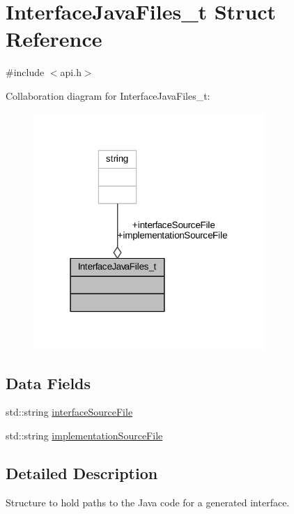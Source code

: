 \hypertarget{struct_interface_java_files__t}{}\section{Interface\+Java\+Files\+\_\+t Struct Reference}
\label{struct_interface_java_files__t}


{\ttfamily \#include $<$api.\+h$>$}



Collaboration diagram for Interface\+Java\+Files\+\_\+t\+:
\nopagebreak
\begin{figure}[H]
\begin{center}
\leavevmode
\includegraphics[width=250pt]{struct_interface_java_files__t__coll__graph}
\end{center}
\end{figure}
\subsection*{Data Fields}
\begin{DoxyCompactItemize}
\item 
std\+::string \hyperlink{struct_interface_java_files__t_ab2a6e18fa1ef213399872c6367d37f0b}{interface\+Source\+File}
\item 
std\+::string \hyperlink{struct_interface_java_files__t_a882976a1e6bc9e4543ad40c7d32e4922}{implementation\+Source\+File}
\end{DoxyCompactItemize}


\subsection{Detailed Description}
Structure to hold paths to the Java code for a generated interface. 

